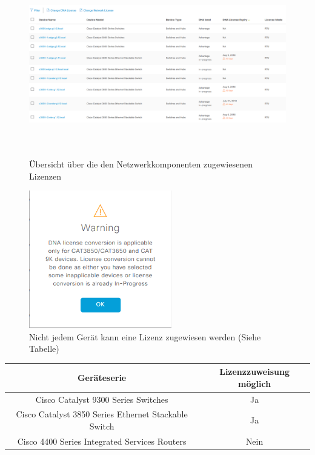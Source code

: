 \begin{figure}[H]
	\centering
	\includegraphics[height=8cm]{img/LicenceManager_003.png}
	\caption{Übersicht über die den Netzwerkkomponenten zugewiesenen Lizenzen}
	\label{fig:dna-center-licence-6}
\end{figure}

\begin{figure}[H]
	\centering
	\includegraphics[height=6cm]{img/LicenceManager_004.png}
	\caption{Nicht jedem Gerät kann eine Lizenz zugewiesen werden (Siehe Tabelle)}
	\label{fig:dna-center-licence-7}
\end{figure}

\begin{tabular}{ | c | c | }
	\hline
	\textbf{Geräteserie} & 	\textbf{Lizenzzuweisung möglich} \\
	\hline
	Cisco Catalyst 9300 Series Switches & Ja \\
	\hline
	Cisco Catalyst 3850 Series Ethernet Stackable Switch & Ja \\
	\hline
	Cisco 4400 Series Integrated Services Routers & Nein \\
	\hline
\end{tabular}


